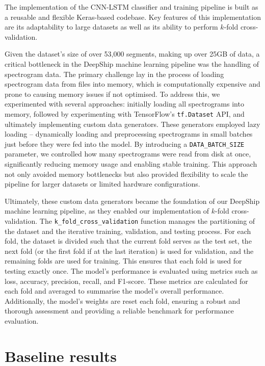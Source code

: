 The implementation of the CNN-LSTM classifier and training pipeline is built as a reusable and flexible Keras-based codebase. Key features of this implementation are its adaptability to large datasets as well as its ability to perform $k$-fold cross-validation. 

Given the dataset's size of over 53,000 segments, making up over 25GB of data, a critical bottleneck in the DeepShip machine learning pipeline was the handling of spectrogram data. The primary challenge lay in the process of loading spectrogram data from files into memory, which is computationally expensive and prone to causing memory issues if not optimised. To address this, we experimented with several approaches: initially loading all spectrograms into memory, followed by experimenting with TensorFlow's \texttt{tf.Dataset} API, and ultimately implementing custom data generators. These generators employed lazy loading -- dynamically loading and preprocessing spectrograms in small batches just before they were fed into the model. By introducing a \texttt{DATA\_BATCH\_SIZE} parameter, we controlled how many spectrograms were read from disk at once, significantly reducing memory usage and enabling stable training. This approach not only avoided memory bottlenecks but also provided flexibility to scale the pipeline for larger datasets or limited hardware configurations. 

Ultimately, these custom data generators became the foundation of our DeepShip machine learning pipeline, as they enabled our implementation of $k$-fold cross-validation. The \texttt{k\_fold\_cross\_validation} function manages the partitioning of the dataset and the iterative training, validation, and testing process. For each fold, the dataset is divided such that the current fold serves as the test set, the next fold (or the first fold if at the last iteration) is used for validation, and the remaining folds are used for training. This ensures that each fold is used for testing exactly once. The model's performance is evaluated using metrics such as loss, accuracy, precision, recall, and F1-score. These metrics are calculated for each fold and averaged to summarise the model's overall performance. Additionally, the model's weights are reset each fold, ensuring a robust and thorough assessment and providing a reliable benchmark for performance evaluation.

\section{Baseline results}\label{sec:baseline-results}

